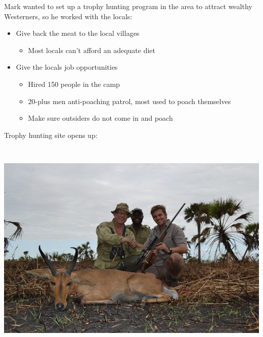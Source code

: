\begin{frame}{}
\protect\hypertarget{section-31}{}

Mark wanted to set up a trophy hunting program in the area to attract
wealthy Westerners, so he worked with the locals:

\begin{itemize}
\tightlist
\item
  Give back the meat to the local villages

  \begin{itemize}
  \tightlist
  \item
    Most locals can't afford an adequate diet
  \end{itemize}
\item
  Give the locals job opportunities

  \begin{itemize}
  \tightlist
  \item
    Hired 150 people in the camp
  \item
    20-plus men anti-poaching patrol, most used to poach themselves
  \item
    Make sure outsiders do not come in and poach
  \end{itemize}
\end{itemize}

\end{frame}

\begin{frame}{}
\protect\hypertarget{section-32}{}

Trophy hunting site opens up:

\includegraphics[width=\textwidth,height=4.16667in]{figures/m4_trophy_hunting.jpg}

\end{frame}

